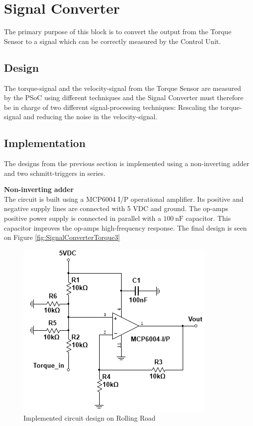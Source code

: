 \newpage
\section{Signal Converter}
The primary purpose of this block is to convert the output from the Torque Sensor to a signal which can be correctly measured by the Control Unit.

\subsection{Design}
The torque-signal and the velocity-signal from the Torque Sensor are measured by the PSoC using different techniques and the Signal Converter must therefore be in charge of two different signal-processing techniques: Rescaling the torque-signal and reducing the noise in the velocity-signal.




\newpage
\subsection{Implementation}
The designs from the previous section is implemented using a non-inverting adder and two schmitt-triggers in series.

\textbf{Non-inverting adder}\\
The circuit is built using a MCP6004 I/P operational amplifier\cite{MCP6004}. Its positive and negative supply lines are connected with 5 VDC and ground. The op-amps positive power supply is connected in parallel with a $\SI{100}{\nano \farad}$ capacitor. This capacitor improves the op-amps high-frequency response. The final design is seen on Figure \vref{fig:SignalConverterTorque3}

\begin{figure}[H]
	\centering
	\includegraphics[width=0.5\linewidth]{Hardware/SignalConverter/TorqueDesign3}
	\caption{Implemented circuit design on Rolling Road}
	\label{fig:SignalConverterTorque3}
\end{figure}

